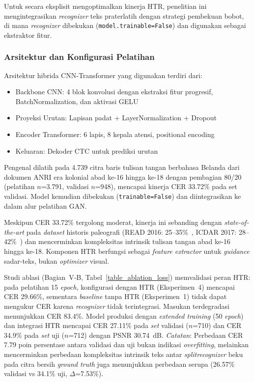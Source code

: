 \documentclass[journal]{IEEEtran}
\begin{document}
Untuk secara eksplisit mengoptimalkan kinerja HTR, penelitian ini mengintegrasikan \textit{recognizer} teks praterlatih dengan strategi pembekuan bobot, di mana \textit{recognizer} dibekukan (\texttt{model.trainable=False}) dan digunakan sebagai ekstraktor fitur.

\subsubsection{Arsitektur dan Konfigurasi Pelatihan}

Arsitektur hibrida CNN-Transformer yang digunakan terdiri dari:
\begin{itemize}
    \item Backbone CNN: 4 blok konvolusi dengan ekstraksi fitur progresif, BatchNormalization, dan aktivasi GELU
    \item Proyeksi Urutan: Lapisan padat + LayerNormalization + Dropout
    \item Encoder Transformer: 6 lapis, 8 kepala atensi, positional encoding
    \item Keluaran: Dekoder CTC untuk prediksi urutan
\end{itemize}

Pengenal dilatih pada 4.739 citra baris tulisan tangan berbahasa Belanda dari dokumen ANRI era kolonial abad ke-16 hingga ke-18 dengan pembagian 80/20 (pelatihan $n$=3.791, validasi $n$=948), mencapai kinerja CER 33.72\% pada set validasi. Model kemudian dibekukan (\texttt{trainable=False}) dan diintegrasikan ke dalam alur pelatihan GAN.

Meskipun CER 33.72\% tergolong moderat, kinerja ini sebanding dengan \textit{state-of-the-art} pada \textit{dataset} historis paleografi (READ 2016: 25--35\%~\cite{sanchez2016icfhr}, ICDAR 2017: 28--42\%~\cite{sanchez2017icdar}) dan mencerminkan kompleksitas intrinsik tulisan tangan abad ke-16 hingga ke-18. Komponen HTR berfungsi sebagai \textit{feature extractor} untuk \textit{guidance} sadar-teks, bukan \textit{optimizer} visual.

Studi ablasi (Bagian~V-B, Tabel~\ref{table_ablation_loss}) memvalidasi peran HTR: pada pelatihan 15 \textit{epoch}, konfigurasi dengan HTR (Eksperimen~4) mencapai CER 29.66\%, sementara \textit{baseline} tanpa HTR (Eksperimen~1) tidak dapat mengukur CER karena \textit{recognizer} tidak terintegrasi. Masukan terdegradasi menunjukkan CER 83.4\%. Model produksi dengan \textit{extended training} (50 \textit{epoch}) dan integrasi HTR mencapai CER 27.11\% pada \textit{set} validasi ($n$=710) dan CER 34.9\% pada \textit{set} uji ($n$=712) dengan PSNR 30.74~dB. \textit{Catatan}: Perbedaan CER 7.79 poin persentase antara validasi dan uji bukan indikasi \textit{overfitting}, melainkan mencerminkan perbedaan kompleksitas intrinsik teks antar \textit{split}\textemdash\textit{recognizer} beku pada citra bersih \textit{ground truth} juga menunjukkan perbedaan serupa (26.57\% validasi vs 34.1\% uji, $\Delta$=7.53\%).
\end{document}
